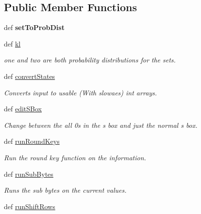 \subsection*{Public Member Functions}
\begin{DoxyCompactItemize}
\item 
\hypertarget{classsimplegui_1_1_main_scene_a2c8156bf798a6cbcc85f8f70b92877c1}{def {\bfseries set\-To\-Prob\-Dist}}\label{classsimplegui_1_1_main_scene_a2c8156bf798a6cbcc85f8f70b92877c1}

\item 
def \hyperlink{classsimplegui_1_1_main_scene_ac7eb263562c3f9a992a00d43ddd7d1a6}{kl}
\begin{DoxyCompactList}\small\item\em one and two are both probability distributions for the sets. \end{DoxyCompactList}\item 
def \hyperlink{classsimplegui_1_1_main_scene_a2fedafb26922217bff2c9b4f0a1e1980}{convert\-States}
\begin{DoxyCompactList}\small\item\em Converts input to usable (With slowaes) int arrays. \end{DoxyCompactList}\item 
def \hyperlink{classsimplegui_1_1_main_scene_a464f594963c80652f89a341d86e675ab}{edit\-S\-Box}
\begin{DoxyCompactList}\small\item\em Change between the all 0s in the s box and just the normal s box. \end{DoxyCompactList}\item 
def \hyperlink{classsimplegui_1_1_main_scene_a6616923509a481f8ab7c99a2764ef5ec}{run\-Round\-Keys}
\begin{DoxyCompactList}\small\item\em Run the round key function on the information. \end{DoxyCompactList}\item 
def \hyperlink{classsimplegui_1_1_main_scene_a8e81494def3ea3c0e56813f6d702a435}{run\-Sub\-Bytes}
\begin{DoxyCompactList}\small\item\em Runs the sub bytes on the current values. \end{DoxyCompactList}\item 
\hypertarget{classsimplegui_1_1_main_scene_a900ce77068dfc386d298f7ef1243529a}{def \hyperlink{classsimplegui_1_1_main_scene_a900ce77068dfc386d298f7ef1243529a}{run\-Shift\-Rows}}\label{classsimplegui_1_1_main_scene_a900ce77068dfc386d298f7ef1243529a}


\end{DoxyCompactItemize}
